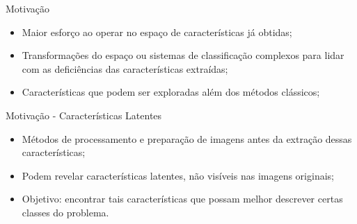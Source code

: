 \documentclass{beamer}
\begin{document}
\begin{frame}{Motivação}
\begin{itemize}
\item Maior esforço ao operar no espaço de características já obtidas;
\item Transformações do espaço ou sistemas de classificação complexos para lidar com as deficiências das características extraídas;
\item Características que podem ser exploradas além dos métodos clássicos;
\end{itemize}
\end{frame}
\begin{frame}{Motivação - Características Latentes}
\begin{itemize}
\item Métodos de processamento e preparação de imagens antes da extração dessas características;
\item Podem revelar características latentes, não visíveis nas imagens originais;
\item Objetivo: encontrar tais características que possam melhor descrever certas classes do problema.
\end{itemize}
\end{frame}
\end{document}
